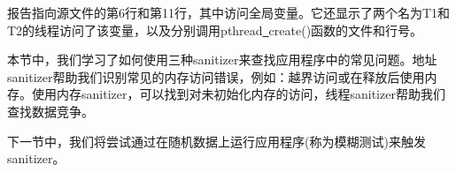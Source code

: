 报告指向源文件的第6行和第11行，其中访问全局变量。它还显示了两个名为T1和T2的线程访问了该变量，以及分别调用pthread\underline{~}create()函数的文件和行号。\par

本节中，我们学习了如何使用三种sanitizer来查找应用程序中的常见问题。地址sanitizer帮助我们识别常见的内存访问错误，例如：越界访问或在释放后使用内存。使用内存sanitizer，可以找到对未初始化内存的访问，线程sanitizer帮助我们查找数据竞争。\par

下一节中，我们将尝试通过在随机数据上运行应用程序(称为模糊测试)来触发sanitizer。\par




















